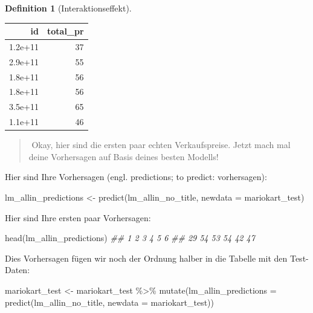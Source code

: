 \documentclass[
  letterpaper,
]{scrbook}
\newenvironment{Shaded}{\begin{snugshade}}{\end{snugshade}}
\newcommand{\AttributeTok}[1]{\textcolor[rgb]{0.40,0.45,0.13}{#1}}
\newcommand{\DocumentationTok}[1]{\textcolor[rgb]{0.37,0.37,0.37}{\textit{#1}}}
\newcommand{\FunctionTok}[1]{\textcolor[rgb]{0.28,0.35,0.67}{#1}}
\newcommand{\NormalTok}[1]{\textcolor[rgb]{0.00,0.23,0.31}{#1}}
\newcommand{\OtherTok}[1]{\textcolor[rgb]{0.00,0.23,0.31}{#1}}
\newcommand{\SpecialCharTok}[1]{\textcolor[rgb]{0.37,0.37,0.37}{#1}}
\theoremstyle{definition}
\theoremstyle{definition}
\theoremstyle{definition}
\newtheorem{definition}{Definition}[chapter]
\theoremstyle{remark}
\begin{document}
\begin{definition}[Interaktionseffekt]
\begin{longtable}[]{@{}rr@{}}
\toprule\noalign{}
id & total\_pr \\
\midrule\noalign{}
\endhead
\bottomrule\noalign{}
\endlastfoot
1.2e+11 & 37 \\
2.9e+11 & 55 \\
1.8e+11 & 56 \\
1.8e+11 & 56 \\
3.5e+11 & 65 \\
1.1e+11 & 46 \\
\end{longtable}

\begin{quote}
{}️ Okay, hier sind die ersten paar echten Verkaufspreise.
Jetzt mach mal deine Vorhersagen auf Basis deines besten Modells!
\end{quote}

Hier sind Ihre Vorhersagen (engl. predictions; to predict: vorhersagen):

\begin{Shaded}
\begin{Highlighting}[]
\NormalTok{lm\_allin\_predictions }\OtherTok{\textless{}{-}} \FunctionTok{predict}\NormalTok{(lm\_allin\_no\_title, }\AttributeTok{newdata =}\NormalTok{ mariokart\_test)}
\end{Highlighting}
\end{Shaded}

Hier sind Ihre ersten paar Vorhersagen:

\begin{Shaded}
\begin{Highlighting}[]
\FunctionTok{head}\NormalTok{(lm\_allin\_predictions)}
\DocumentationTok{\#\#  1  2  3  4  5  6 }
\DocumentationTok{\#\# 29 54 53 54 42 47}
\end{Highlighting}
\end{Shaded}

Dies Vorhersagen fügen wir noch der Ordnung halber in die Tabelle mit
den Test-Daten:

\begin{Shaded}
\begin{Highlighting}[]
\NormalTok{mariokart\_test }\OtherTok{\textless{}{-}}
\NormalTok{  mariokart\_test }\SpecialCharTok{\%\textgreater{}\%} 
  \FunctionTok{mutate}\NormalTok{(}\AttributeTok{lm\_allin\_predictions =} \FunctionTok{predict}\NormalTok{(lm\_allin\_no\_title, }\AttributeTok{newdata =}\NormalTok{ mariokart\_test))}
\end{Highlighting}
\end{Shaded}


\end{definition}
\end{document}
